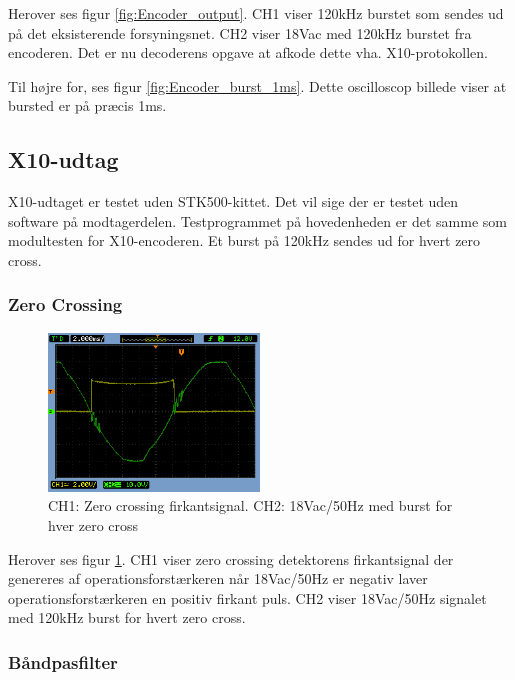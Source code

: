 Herover ses figur \ref{fig:Encoder_output}. CH1 viser 120kHz burstet som sendes ud på det eksisterende forsyningsnet. CH2 viser 18Vac med 120kHz burstet fra encoderen. Det er nu decoderens opgave at afkode dette vha. X10-protokollen.

Til højre for, ses figur \ref{fig:Encoder_burst_1ms}. Dette oscilloscop billede viser at bursted er på præcis 1ms. 

\subsection{X10-udtag}
X10-udtaget er testet uden STK500-kittet. Det vil sige der er testet uden software på modtagerdelen. Testprogrammet på hovedenheden er det samme som modultesten for X10-encoderen. Et burst på 120kHz sendes ud for hvert zero cross. 

\subsubsection{Zero Crossing}

\begin{figure}[H]
	\centering
	\includegraphics[width=0.50\textwidth]{billeder/HWTest/Decoder/Decoder_zerocross}
	\caption{CH1: Zero crossing firkantsignal. CH2: 18Vac/50Hz med burst for hver zero cross}
	\label{fig:Decoder_ZC}
\end{figure}

Herover ses figur \ref{fig:Decoder_ZC}. CH1 viser zero crossing detektorens firkantsignal der genereres af operationsforstærkeren når 18Vac/50Hz er negativ laver operationsforstærkeren en positiv firkant puls. CH2 viser 18Vac/50Hz signalet med 120kHz burst for hvert zero cross.   

\subsubsection{Båndpasfilter}

